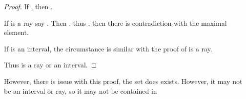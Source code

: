 \begin{enumerate}
\begin{proof}
            If , then . 

            If  is a ray say . Then , thus , then there is contradiction with the maximal element.

            If  is an interval, the circumstance is similar with the proof of  is a ray.

            Thus  is a ray or an interval.
      \end{proof}

      However, there is issue with this proof, the set  does exists. However, it may not be an interval or ray, so it may not be contained in 
      
\end{enumerate}
